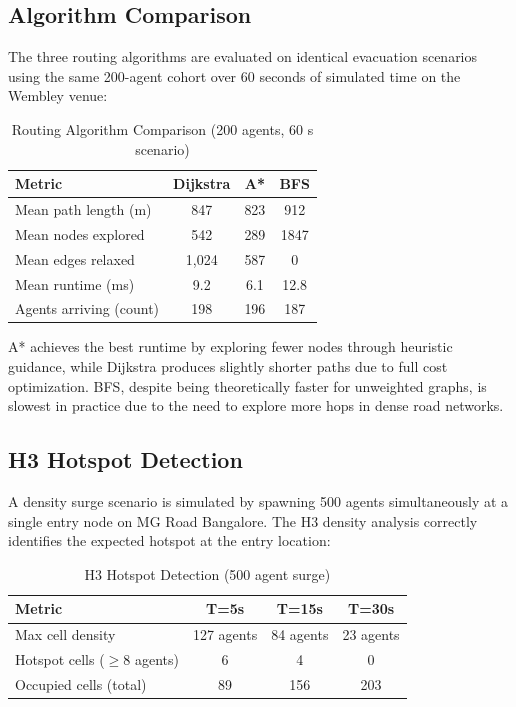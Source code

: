 \documentclass[conference]{IEEEtran}
\begin{document}
\subsection{Algorithm Comparison}

The three routing algorithms are evaluated on identical evacuation scenarios using the same 200-agent cohort over 60 seconds of simulated time on the Wembley venue:

\begin{table}[ht]
\centering
\caption{Routing Algorithm Comparison (200 agents, 60 s scenario)}
\label{tab:algorithms}
\renewcommand{\arraystretch}{1.15}
\begin{tabular}{|l|c|c|c|}
\hline
\textbf{Metric} & \textbf{Dijkstra} & \textbf{A*} & \textbf{BFS} \\
\hline
Mean path length (m) & 847 & 823 & 912 \\
\hline
Mean nodes explored & 542 & 289 & 1847 \\
\hline
Mean edges relaxed & 1,024 & 587 & 0 \\
\hline
Mean runtime (ms) & 9.2 & 6.1 & 12.8 \\
\hline
Agents arriving (count) & 198 & 196 & 187 \\
\hline
\end{tabular}
\end{table}

A* achieves the best runtime by exploring fewer nodes through heuristic guidance, while Dijkstra produces slightly shorter paths due to full cost optimization. BFS, despite being theoretically faster for unweighted graphs, is slowest in practice due to the need to explore more hops in dense road networks.

\subsection{H3 Hotspot Detection}

A density surge scenario is simulated by spawning 500 agents simultaneously at a single entry node on MG Road Bangalore. The H3 density analysis correctly identifies the expected hotspot at the entry location:

\begin{table}[ht]
\centering
\caption{H3 Hotspot Detection (500 agent surge)}
\label{tab:hotspots}
\renewcommand{\arraystretch}{1.15}
\begin{tabular}{|l|c|c|c|}
\hline
\textbf{Metric} & \textbf{T=5s} & \textbf{T=15s} & \textbf{T=30s} \\
\hline
Max cell density & 127 agents & 84 agents & 23 agents \\
\hline
Hotspot cells ($\geq 8$ agents) & 6 & 4 & 0 \\
\hline
Occupied cells (total) & 89 & 156 & 203 \\
\hline
\end{tabular}
\end{table}
\end{document}
